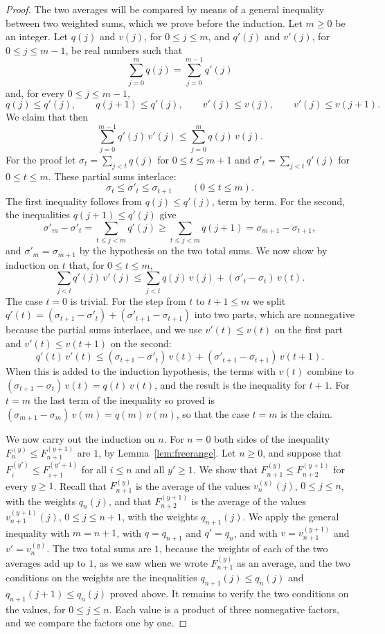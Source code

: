 \documentclass{amsart}
\theoremstyle{definition}
\theoremstyle{remark}
\numberwithin{equation}{section}
\begin{document}
\begin{proof}
The two averages will be compared by means of a general inequality between two weighted sums, which we prove before the induction. Let $m\ge 0$ be an integer. Let $q(j)$ and $v(j)$, for $0\le j\le m$, and $q'(j)$ and $v'(j)$, for $0\le j\le m-1$, be real numbers such that
\[
\sum_{j=0}^{m}q(j)=\sum_{j=0}^{m-1}q'(j)
\]
and, for every $0\le j\le m-1$,
\[
q(j)\le q'(j),\qquad q(j+1)\le q'(j),\qquad v'(j)\le v(j),\qquad v'(j)\le v(j+1).
\]
We claim that then
\[
\sum_{j=0}^{m-1}q'(j)\,v'(j)\le\sum_{j=0}^{m}q(j)\,v(j).
\]
For the proof let $\sigma_t=\sum_{j<t}q(j)$ for $0\le t\le m+1$ and $\sigma'_t=\sum_{j<t}q'(j)$ for $0\le t\le m$. These partial sums interlace:
\[
\sigma_t\le\sigma'_t\le\sigma_{t+1}\qquad(0\le t\le m).
\]
The first inequality follows from $q(j)\le q'(j)$, term by term. For the second, the inequalities $q(j+1)\le q'(j)$ give
\[
\sigma'_m-\sigma'_t=\sum_{t\le j<m}q'(j)\ge\sum_{t\le j<m}q(j+1)=\sigma_{m+1}-\sigma_{t+1},
\]
and $\sigma'_m=\sigma_{m+1}$ by the hypothesis on the two total sums. We now show by induction on $t$ that, for $0\le t\le m$,
\[
\sum_{j<t}q'(j)\,v'(j)\le\sum_{j<t}q(j)\,v(j)+(\sigma'_t-\sigma_t)\,v(t).
\]
The case $t=0$ is trivial. For the step from $t$ to $t+1\le m$ we split $q'(t)=(\sigma_{t+1}-\sigma'_t)+(\sigma'_{t+1}-\sigma_{t+1})$ into two parts, which are nonnegative because the partial sums interlace, and we use $v'(t)\le v(t)$ on the first part and $v'(t)\le v(t+1)$ on the second:
\[
q'(t)\,v'(t)\le(\sigma_{t+1}-\sigma'_t)\,v(t)+(\sigma'_{t+1}-\sigma_{t+1})\,v(t+1).
\]
When this is added to the induction hypothesis, the terms with $v(t)$ combine to $(\sigma_{t+1}-\sigma_t)\,v(t)=q(t)\,v(t)$, and the result is the inequality for $t+1$. For $t=m$ the last term of the inequality so proved is $(\sigma_{m+1}-\sigma_m)\,v(m)=q(m)\,v(m)$, so that the case $t=m$ is the claim.

We now carry out the induction on $n$. For $n=0$ both sides of the inequality $F^{(y)}_n\le F^{(y+1)}_{n+1}$ are $1$, by Lemma~\ref{lem:freerange}. Let $n\ge 0$, and suppose that $F^{(y')}_i\le F^{(y'+1)}_{i+1}$ for all $i\le n$ and all $y'\ge 1$. We show that $F^{(y)}_{n+1}\le F^{(y+1)}_{n+2}$ for every $y\ge 1$. Recall that $F^{(y)}_{n+1}$ is the average of the values $v^{(y)}_n(j)$, $0\le j\le n$, with the weights $q_n(j)$, and that $F^{(y+1)}_{n+2}$ is the average of the values $v^{(y+1)}_{n+1}(j)$, $0\le j\le n+1$, with the weights $q_{n+1}(j)$. We apply the general inequality with $m=n+1$, with $q=q_{n+1}$ and $q'=q_n$, and with $v=v^{(y+1)}_{n+1}$ and $v'=v^{(y)}_n$. The two total sums are $1$, because the weights of each of the two averages add up to $1$, as we saw when we wrote $F^{(y)}_{n+1}$ as an average, and the two conditions on the weights are the inequalities $q_{n+1}(j)\le q_n(j)$ and $q_{n+1}(j+1)\le q_n(j)$ proved above. It remains to verify the two conditions on the values, for $0\le j\le n$. Each value is a product of three nonnegative factors, and we compare the factors one by one.


\end{proof}
\end{document}
